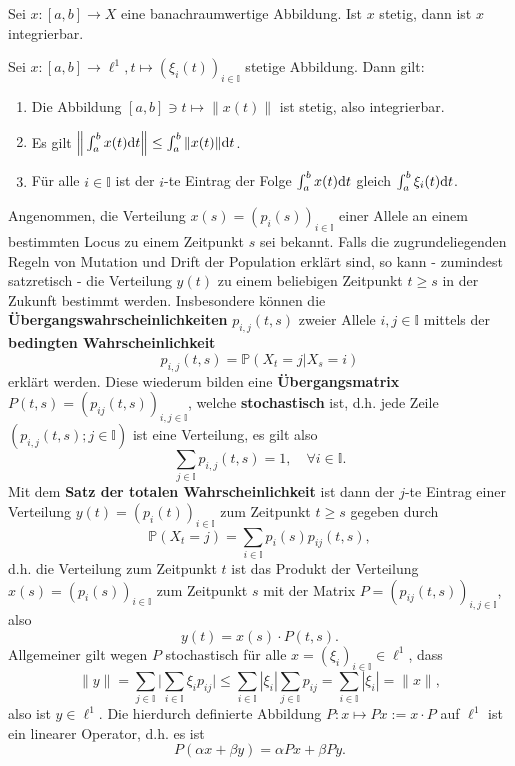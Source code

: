 \begin{prop}
  Sei $x\colon[a,b]\to X$ eine banachraumwertige Abbildung. Ist $x$ stetig, dann ist $x$ integrierbar.
\end{prop}

\begin{prop}
  Sei $x\colon[a,b]\to \ell^1, t\mapsto (\xi_i(t))_{i\in\mathbb I}$ stetige Abbildung. Dann gilt:
  \begin{enumerate}
      \item Die Abbildung $[a,b]\ni t\mapsto\|x(t)\|$ ist stetig, also integrierbar. 
      \item Es gilt $\Big\|\int_a^b x(t)\text dt\Big\| \leq\int_a^b\|x(t)\|\text dt$.
      \item Für alle $i\in\mathbb I$ ist der $i$-te Eintrag der Folge $\int_a^b x(t)\text dt$ gleich $\int_a^b\xi_i(t)\text dt$.
  \end{enumerate}
\end{prop}


Angenommen, die Verteilung $x(s)=(p_i(s))_{i\in\mathbb I}$ einer Allele an einem bestimmten Locus zu einem Zeitpunkt $s$ sei bekannt. Falls die zugrundeliegenden Regeln von Mutation und Drift der Population erklärt sind, so kann - zumindest satzretisch - die Verteilung $y(t)$ zu einem beliebigen Zeitpunkt $t\geq s$ in der Zukunft bestimmt werden. Insbesondere können die \textbf{Übergangswahrscheinlichkeiten} $p_{i,j}(t,s)$ zweier Allele $i,j\in\mathbb I$ mittels der \textbf{bedingten Wahrscheinlichkeit} 
$$p_{i,j}(t,s)=\mathbb P(X_t=j|X_s=i)$$ erklärt werden. Diese wiederum bilden eine \textbf{Übergangsmatrix} $P(t,s)=(p_{ij}(t,s))_{i,j\in\mathbb I}$, welche \textbf{stochastisch} ist, d.h. jede Zeile $(p_{i,j}(t,s);j\in\mathbb I)$ ist eine Verteilung, es gilt also  $$\sum_{j\in \mathbb I} p_{i,j}(t,s)=1,\quad\forall i\in \mathbb I.$$
Mit dem \textbf{Satz der totalen Wahrscheinlichkeit} ist dann der $j$-te Eintrag einer Verteilung $y(t)=(p_i(t))_{i\in\mathbb I}$ zum Zeitpunkt $t\geq s$ gegeben durch 
$$\mathbb P(X_t=j)=\sum_{i\in\mathbb I}p_i(s) p_{ij}(t,s),$$ d.h. die Verteilung zum Zeitpunkt $t$ ist das Produkt der Verteilung $x(s)=(p_i(s))_{i\in\mathbb I}$ zum Zeitpunkt $s$ mit der Matrix $P=(p_{ij}(t,s))_{i,j\in\mathbb I}$, also $$y(t)= x(s)\cdot P(t,s).$$ Allgemeiner gilt wegen $P$ stochastisch für alle $x=(\xi_i)_{i\in\mathbb I}\in\ell^1$, dass $$\|y\|=\sum_{j\in\mathbb I}\Bigg|\sum_{i\in\mathbb I}\xi_i p_{ij}\Bigg|\leq\sum_{i\in\mathbb I}|\xi_i|\sum_{j\in\mathbb I}p_{ij}=\sum_{i\in\mathbb I}|\xi_i|=\|x\|,$$ 
also ist $y\in\ell^1$. Die hierdurch definierte Abbildung $P\colon x\mapsto Px:=x\cdot P$  auf $\ell^1$ ist ein  linearer Operator, d.h. es ist $$P(\alpha x+\beta y)=\alpha Px + \beta Py.$$


